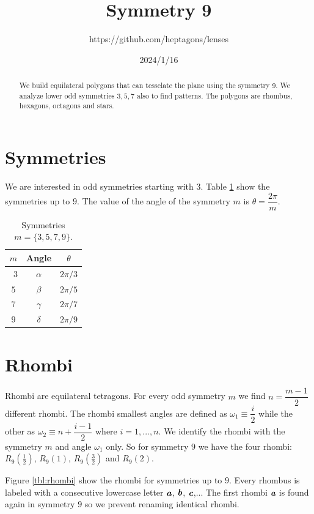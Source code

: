 \documentclass[11pt]{article}
\title{Symmetry 9}
\author{https://github.com/heptagons/lenses}
\date{2024/1/16}
\def\mathbi#1{\textbf{\em #1}}
\begin{document}
\maketitle
\begin{abstract}
We build equilateral polygons that can tesselate the plane using the symmetry $9$. We analyze lower odd symmetries $3,5,7$ also to find patterns. The polygons are rhombus, hexagons, octagons and stars.
\end{abstract}

\section{Symmetries}

We are interested in odd symmetries starting with $3$. Table \ref{tbl:symm} show the symmetries up to $9$. The value of the angle of the symmetry $m$ is $\theta = \dfrac{2\pi}m$. 

\begin{table}[H]
\begin{center}
\begin{tabular}{|c|c c|}
\hline
$m$ & Angle & $\theta$ \\ \hline\
$3$ & $\alpha$ & $2\pi/3$ \\ \hline
$5$ & $\beta$  & $2\pi/5$ \\ \hline
$7$ & $\gamma$ & $2\pi/7$ \\ \hline
$9$ & $\delta$ & $2\pi/9$ \\ \hline
\end{tabular}
\caption{Symmetries $m=\{3,5,7,9\}$.} 
\label{tbl:symm}
\end{center}
\end{table}

\section{Rhombi}

Rhombi are equilateral tetragons. For every odd symmetry $m$ we find $n = \dfrac{m-1}2$ different rhombi. The rhombi smallest angles are defined as $\omega_1 \equiv \dfrac{i}2$ while the other as $\omega_2 \equiv n + \dfrac{i-1}2$ where $i = 1,...,n$. We identify the rhombi with the symmetry $m$ and angle $\omega_1$ only. So for symmetry $9$ we have the four rhombi: $R_9\left(\frac{1}2\right)$, $R_9(1)$, $R_9\left(\frac{3}2\right)$ and $R_9(2)$.

Figure \ref{tbl:rhombi} show the rhombi for symmetries up to $9$. Every rhombus is labeled with a consecutive lowercase letter $\mathbi{a}$, $\mathbi{b}$, $\mathbi{c}$,... The first rhombi $\mathbi{a}$ is found again in symmetry $9$ so we prevent renaming identical rhombi.
\end{document}
